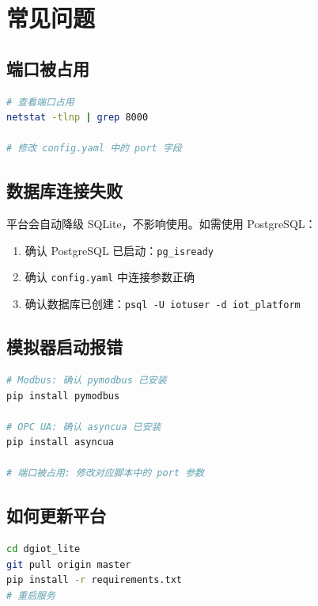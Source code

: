 \documentclass[12pt,a4paper]{ctexart}
\begin{document}
\section{常见问题}

\subsection{端口被占用}

\begin{lstlisting}[language=bash]
# 查看端口占用
netstat -tlnp | grep 8000

# 修改 config.yaml 中的 port 字段
\end{lstlisting}

\subsection{数据库连接失败}

平台会自动降级 SQLite，不影响使用。如需使用 PostgreSQL：
\begin{enumerate}
  \item 确认 PostgreSQL 已启动：\texttt{pg\_isready}
  \item 确认 \texttt{config.yaml} 中连接参数正确
  \item 确认数据库已创建：\texttt{psql -U iotuser -d iot\_platform}
\end{enumerate}

\subsection{模拟器启动报错}

\begin{lstlisting}[language=bash]
# Modbus: 确认 pymodbus 已安装
pip install pymodbus

# OPC UA: 确认 asyncua 已安装
pip install asyncua

# 端口被占用: 修改对应脚本中的 port 参数
\end{lstlisting}

\subsection{如何更新平台}

\begin{lstlisting}[language=bash]
cd dgiot_lite
git pull origin master
pip install -r requirements.txt
# 重启服务
\end{lstlisting}
\end{document}
